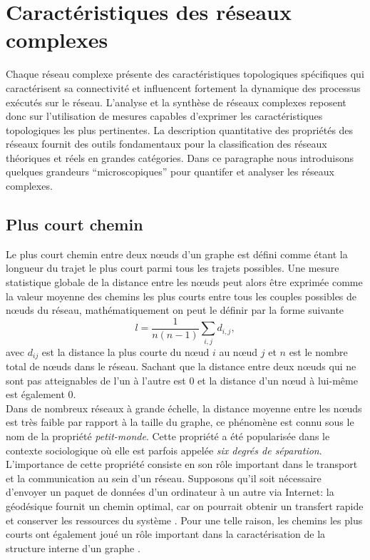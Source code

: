 \section{Caractéristiques des réseaux complexes}
Chaque réseau complexe présente des caractéristiques topologiques spécifiques qui caractérisent sa
connectivité et influencent fortement la dynamique des processus exécutés sur le réseau. L'analyse  et 
la synthèse de réseaux complexes reposent donc sur l'utilisation de mesures capables d'exprimer les caractéristiques
topologiques les plus pertinentes. La description quantitative des propriétés des réseaux fournit des
outils fondamentaux pour la classification des réseaux théoriques et réels en grandes catégories. Dans ce paragraphe 
nous introduisons quelques grandeurs ``microscopiques'' pour quantifer et analyser les réseaux complexes.

\subsection{Plus court chemin}

Le plus court chemin entre deux nœuds d'un graphe est défini comme étant la longueur du trajet le plus court parmi tous les trajets possibles. Une
mesure statistique globale de la distance entre les nœuds peut alors être exprimée comme la valeur moyenne des chemins les
plus courts entre tous les couples possibles de nœuds du réseau, mathématiquement on peut le définir par la forme suivante
\begin{equation}
l=\frac{1}{n(n-1)}\sum_{i,j} d_{i,j},
\end{equation}
avec $d_{ij}$ est la distance la plus courte du nœud $i$ au nœud $j$ et $n$ est le nombre total de nœuds dans le réseau. Sachant que la distance entre deux nœuds qui ne sont pas atteignables de l'un à l'autre est $0$  et la distance d'un nœud à lui-même est également $0$.\\
Dans de nombreux réseaux à grande échelle, la distance moyenne entre les nœuds est très faible par rapport à la taille du graphe, ce phénomène est connu sous le nom de la propriété \textit{petit-monde}. Cette propriété a été popularisée dans le contexte sociologique où elle est parfois appelée \textit{six degrés de séparation}\cite{Mi1967}.\\
L'importance de cette propriété consiste en son rôle important dans le transport et la communication au sein d'un réseau. Supposons qu'il soit nécessaire d'envoyer un paquet de données d'un ordinateur à un autre via Internet: la géodésique fournit un chemin  optimal, car on pourrait obtenir un transfert rapide et conserver les ressources du système \cite{PV2004}. Pour une telle raison, les chemins les plus courts ont également joué un rôle important dans la caractérisation de la structure interne d'un graphe \cite{Wa1994,JS2000,Bo-al2006}.

